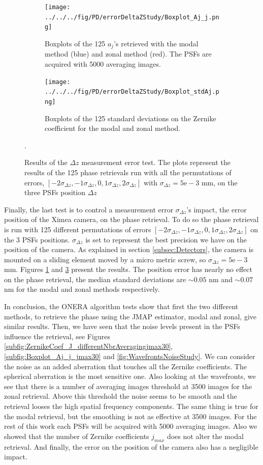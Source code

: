 \begin{figure}
\centering
    \begin{subfigure}{0.45\textwidth}
        \texttt{[image: ../../../fig/PD/errorDeltaZStudy/Boxplot\_Aj\_j.png]}
        \caption{Boxplots of the 125 $a_j$'s retrieved with the modal method (blue) and zonal method (red). The PSFs are acquired with 5000 averaging images.}
        \label{subfig:Boxplot_Aj_j}
    \end{subfigure}
    \quad
    \begin{subfigure}{0.45\textwidth}
        \texttt{[image: ../../../fig/PD/errorDeltaZStudy/Boxplot\_stdAj.png]}
        \caption{Boxplots of the 125 standard deviations on the Zernike coefficient for the modal and zonal method.}
        \label{subfig:Boxplot_stdAj}
    \end{subfigure}
    \decoRule
    \caption{Results of the $\Delta z$ measurement error test. The plots represent the results of the 125 phase retrievals run with all the permutations of errors, $[-2\sigma_{\Delta z},-1\sigma_{\Delta z},0,1\sigma_{\Delta z},2\sigma_{\Delta z}]$ with $\sigma_{\Delta z} = 5\mathrm{e}-3$ mm, on the three PSFs position $\Delta z$}.
\end{figure}

Finally, the last test is to control a measurement error $\sigma_{\Delta z}$'s impact, the error position of the Ximea camera, on the phase retrieval. To do so the phase retrieval is run with 125 different permutations of errors $[-2\sigma_{\Delta z},-1\sigma_{\Delta z},0,1\sigma_{\Delta z},2\sigma_{\Delta z}]$ on the 3 PSFs positions. $\sigma_{\Delta z}$ is set to represent the best precision we have on the position of the camera. As explained in section \ref{subsec:Detectors}, the camera is mounted on a sliding element moved by a micro metric screw, so $\sigma_{\Delta z} = 5\mathrm{e}-3$ mm. Figures \ref{subfig:Boxplot_Aj_j} and \ref{subfig:Boxplot_stdAj} present the results. The position error has nearly no effect on the phase retrieval, the median standard deviations are $\sim0.05$ nm and $\sim0.07$ nm for the modal and zonal methods respectively.

In conclusion, the ONERA algorithm tests show that first the two different methods, to retrieve the phase using the JMAP estimator, modal and zonal, give similar results. Then, we have seen that the noise levels present in the PSFs influence the retrieval, see Figures \ref{subfig:ZernikeCoef_J_differentNbrAveragingjmax30}, \ref{subfig:Boxplot_Aj_j_jmax30} and \ref{fig:WavefrontsNoiseStudy}. We can consider the noise as an added aberration that touches all the Zernike coefficients. The spherical aberration is the most sensitive one. Also looking at the wavefronts, we see that there is a number of averaging images threshold at 3500 images for the zonal retrieval. Above this threshold the noise seems to be smooth and the retrieval looses the high spatial frequency components. The same thing is true for the modal retrieval, but the smoothing is not as effective at 3500 images. For the rest of this work each PSFs will be acquired with 5000 averaging images. Also we showed that the number of Zernike coefficients $j_{max}$ does not alter the modal retrieval. And finally, the error on the position of the camera also has a negligible impact.


